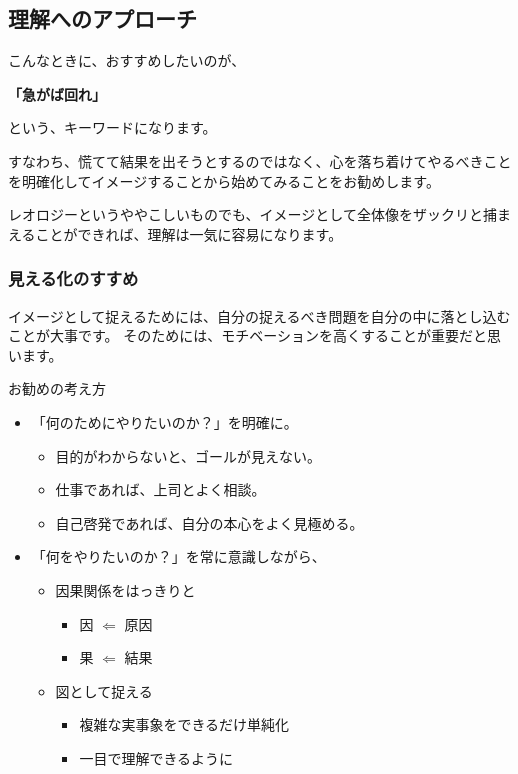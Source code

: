 \documentclass[uplatex,dvipdfmx,a4paper,11pt]{jsreport}
\begin{document}
\subsection{理解へのアプローチ}
こんなときに、おすすめしたいのが、
\begin{center}
	\Huge{\bf「急がば回れ」}
\end{center}
という、キーワードになります。

すなわち、慌てて結果を出そうとするのではなく、心を落ち着けてやるべきことを明確化してイメージすることから始めてみることをお勧めします。

レオロジーというややこしいものでも、イメージとして全体像をザックリと捕まえることができれば、理解は一気に容易になります。

\subsubsection{見える化のすすめ}

イメージとして捉えるためには、自分の捉えるべき問題を自分の中に落とし込むことが大事です。
そのためには、モチベーションを高くすることが重要だと思います。
\large
\begin{itembox}[l]{お勧めの考え方}
	\begin{itemize}
		\item 「何のためにやりたいのか？」を明確に。
		\begin{itemize}
			\item 目的がわからないと、ゴールが見えない。
			\item 仕事であれば、上司とよく相談。
			\item 自己啓発であれば、自分の本心をよく見極める。
		\end{itemize}
		\item 「何をやりたいのか？」を常に意識しながら、
		\begin{itemize}
			\item 因果関係をはっきりと
			\begin{itemize}
				\item 因 $\Leftarrow$ 原因
				\item 果 $\Leftarrow$ 結果
			\end{itemize}
			\item 図として捉える
			\begin{itemize}
				\item 複雑な実事象をできるだけ単純化
				\item 一目で理解できるように  
			\end{itemize}
		\end{itemize}
	\end{itemize}
\end{itembox}
\normalsize
\end{document}
